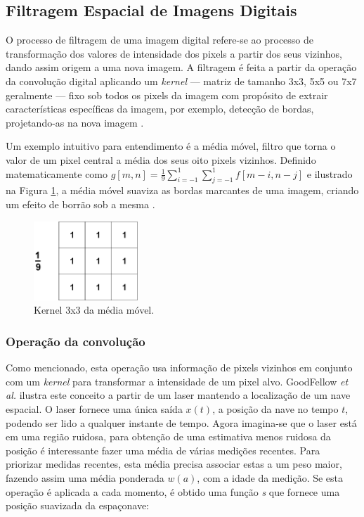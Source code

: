 \documentclass[12pt]{report}
\begin{document}
\subsection{Filtragem Espacial de Imagens Digitais}

O processo de filtragem de uma imagem digital refere-se ao processo de transformação dos valores de intensidade dos pixels a partir dos seus vizinhos, dando assim origem a uma nova imagem. A filtragem é feita a partir da operação da convolução digital aplicando um \textit{kernel} --- matriz de tamanho 3x3, 5x5 ou 7x7 geralmente --- fixo sob todos os pixels da imagem com propósito de extrair características específicas da imagem, por exemplo, detecção de bordas, projetando-as na nova imagem \cite{stanford}.

Um exemplo intuitivo para entendimento é a média móvel, filtro que torna o valor de um pixel central a média dos seus oito pixels vizinhos. Definido matematicamente como $g[m,n] = \frac{1}{9} \sum_{i= -1}^{1} \sum_{j= -1}^{1} f[m - i,n - j]$ e ilustrado na Figura \ref{fig:blur}, a média móvel suaviza as bordas marcantes de uma imagem, criando um efeito de borrão sob a mesma \cite{stanford}.

\begin{figure}
    \centering
    \includegraphics[width=0.35\textwidth]{images/blur.png}
    \caption{Kernel 3x3 da média móvel.}
    \label{fig:blur}
\end{figure}

\subsubsection{Operação da convolução}

Como mencionado, esta operação usa informação de pixels vizinhos em conjunto com um \textit{kernel} para transformar a intensidade de um pixel alvo. GoodFellow \textit{et al.} \cite{Goodfellow} ilustra este conceito a partir de um laser mantendo a localização de um nave espacial. O laser fornece uma única saída $x(t)$, a posição da nave no tempo $t$, podendo ser lido a qualquer instante de tempo. Agora imagina-se que o laser está em uma região ruidosa, para obtenção de uma estimativa menos ruidosa da posição é interessante fazer uma média de várias medições recentes. Para priorizar medidas recentes, esta média precisa associar estas a um peso maior, fazendo assim uma média ponderada $w(a)$, com a idade da medição. Se esta operação é aplicada a cada momento, é obtido uma função \textit{s} que fornece uma posição suavizada da espaçonave:
\end{document}
